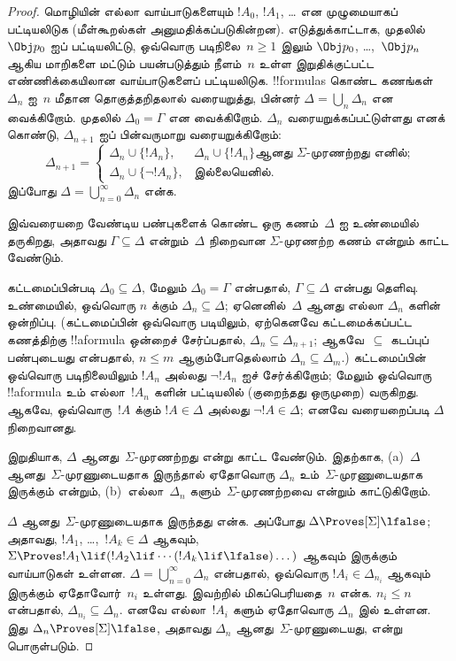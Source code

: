 \documentclass[../../../include/open-logic-section]{subfiles}
\begin{document}
\begin{proof}
மொழியின் எல்லா வாய்பாடுகளையும் $!A_0$, $!A_1$, \dots{} என முழுமையாகப்
பட்டியலிடுக (மீள்கூறல்கள் அனுமதிக்கப்படுகின்றன). எடுத்துக்காட்டாக, முதலில்
$\Obj p_0$ ஐப் பட்டியலிட்டு, ஒவ்வொரு படிநிலை~$n \ge 1$ இலும்
$\Obj p_0$, \dots,~$\Obj p_n$ ஆகிய மாறிகளை மட்டும் பயன்படுத்தும்
நீளம்~$n$ உள்ள இறுதிக்குட்பட்ட எண்ணிக்கையிலான வாய்பாடுகளைப் பட்டியலிடுக.
!!{formula}s கொண்ட கணங்கள்~$\Delta_n$ ஐ~$n$ மீதான தொகுத்தறிதலால்
வரையறுத்து, பின்னர் $\Delta = \bigcup_n \Delta_n$ என வைக்கிறோம்.
முதலில் $\Delta_0 = \Gamma$ என வைக்கிறோம். $\Delta_n$
வரையறுக்கப்பட்டுள்ளது எனக் கொண்டு, $\Delta_{n+1}$ ஐப் பின்வருமாறு
வரையறுக்கிறோம்:
\[
\Delta_{n+1} =
\begin{cases}
  \Delta_n \cup \{!A_n\}, & \text{$\Delta_n \cup \{ !A_n\}$
    ஆனது~$\Sigma$-முரணற்றது எனில்;} \\
  \Delta_n \cup \{ \lnot !A_n\}, & \text{இல்லையெனில்.}
\end{cases}
\]
இப்போது $\Delta = \bigcup_{n=0}^\infty \Delta_n$ என்க.

இவ்வரையறை வேண்டிய பண்புகளைக் கொண்ட ஒரு கணம்~$\Delta$ ஐ உண்மையில்
தருகிறது, அதாவது $\Gamma \subseteq \Delta$ என்றும்~$\Delta$ நிறைவான
$\Sigma$-முரணற்ற கணம் என்றும் காட்ட வேண்டும்.

கட்டமைப்பின்படி $\Delta_0 \subseteq \Delta$, மேலும் $\Delta_0 = \Gamma$
என்பதால், $\Gamma \subseteq \Delta$ என்பது தெளிவு. உண்மையில், ஒவ்வொரு
$n$ க்கும் $\Delta_n \subseteq \Delta$; ஏனெனில்~$\Delta$ ஆனது எல்லா
$\Delta_n$ களின் ஒன்றிப்பு. (கட்டமைப்பின் ஒவ்வொரு படியிலும், ஏற்கெனவே
கட்டமைக்கப்பட்ட கணத்திற்கு !!a{formula} ஒன்றைச் சேர்ப்பதால்,
$\Delta_n \subseteq \Delta_{n+1}$; ஆகவே~$\subseteq$ கடப்புப் பண்புடையது
என்பதால், $n \le m$ ஆகும்போதெல்லாம் $\Delta_n \subseteq \Delta_{m}$.)
கட்டமைப்பின் ஒவ்வொரு படிநிலையிலும் $!A_n$ அல்லது $\lnot !A_n$ ஐச்
சேர்க்கிறோம்; மேலும் ஒவ்வொரு !!a{formula} உம் எல்லா~$!A_n$ களின்
பட்டியலில் (குறைந்தது ஒருமுறை) வருகிறது. ஆகவே, ஒவ்வொரு~$!A$ க்கும்
$!A \in \Delta$ அல்லது $\lnot !A \in \Delta$; எனவே வரையறைப்படி
$\Delta$ நிறைவானது.

இறுதியாக, $\Delta$ ஆனது~$\Sigma$-முரணற்றது என்று காட்ட வேண்டும்.
இதற்காக, (a)~$\Delta$ ஆனது~$\Sigma$-முரணுடையதாக இருந்தால் ஏதோவொரு
$\Delta_n$ உம்~$\Sigma$-முரணுடையதாக இருக்கும் என்றும்,
(b)~எல்லா~$\Delta_n$ களும்~$\Sigma$-முரணற்றவை என்றும் காட்டுகிறோம்.

$\Delta$ ஆனது~$\Sigma$-முரணுடையதாக இருந்தது என்க. அப்போது
$\Delta \Proves[\Sigma] \lfalse$; அதாவது, $!A_1$, \dots,~$!A_k \in
\Delta$ ஆகவும், $\Sigma \Proves !A_1 \lif (!A_2 \lif \cdots (!A_k
\lif \lfalse)\dots)$ ஆகவும் இருக்கும் வாய்பாடுகள் உள்ளன.
$\Delta = \bigcup_{n=0}^\infty \Delta_n$ என்பதால், ஒவ்வொரு
$!A_i \in \Delta_{n_i}$ ஆகவும் இருக்கும் ஏதோவோர்~$n_i$ உள்ளது.
இவற்றில் மிகப்பெரியதை~$n$ என்க. $n_i \le n$ என்பதால்,
$\Delta_{n_i} \subseteq \Delta_n$. எனவே எல்லா~$!A_i$ களும் ஏதோவொரு
$\Delta_n$ இல் உள்ளன. இது $\Delta_n \Proves[\Sigma] \lfalse$,
அதாவது $\Delta_n$ ஆனது~$\Sigma$-முரணுடையது, என்று பொருள்படும்.


\end{proof}
\end{document}
